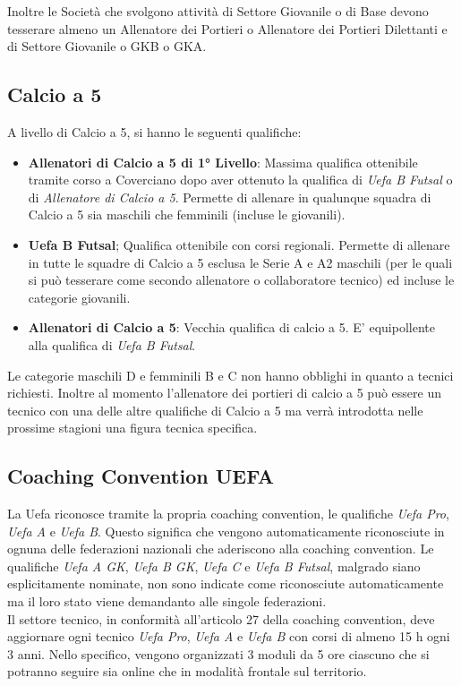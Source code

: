 \documentclass[../uefaC.tex]{subfiles}
\begin{document}
Inoltre le Società che svolgono attività di Settore Giovanile o di Base devono tesserare almeno un Allenatore dei Portieri o Allenatore dei Portieri Dilettanti e di Settore Giovanile o GKB o GKA.

\subsection{Calcio a 5}
A livello di Calcio a 5, si hanno le seguenti qualifiche:
\begin{itemize}
    \item\textbf{Allenatori di Calcio a 5 di 1° Livello}: Massima qualifica ottenibile tramite corso a Coverciano dopo aver ottenuto la qualifica di \emph{Uefa B Futsal} o di \emph{Allenatore di Calcio a 5}. Permette di allenare in qualunque squadra di Calcio a 5 sia maschili che femminili (incluse le giovanili).
    \item\textbf{Uefa B Futsal}; Qualifica ottenibile con corsi regionali. Permette di allenare in tutte le squadre di Calcio a 5 esclusa le Serie A e A2 maschili (per le quali si può tesserare come secondo allenatore o collaboratore tecnico) ed incluse le categorie giovanili.
    \item\textbf{Allenatori di Calcio a 5}: Vecchia qualifica di calcio a 5. E' equipollente alla qualifica di \emph{Uefa B Futsal}.
\end{itemize}

Le categorie maschili D e femminili B e C non hanno obblighi in quanto a tecnici richiesti. Inoltre al momento l'allenatore dei portieri di calcio a 5 può essere un tecnico con una delle altre qualifiche di Calcio a 5 ma verrà introdotta nelle prossime stagioni una figura tecnica specifica.

\subsection{Coaching Convention UEFA}
La Uefa riconosce tramite la propria coaching convention, le qualifiche \emph{Uefa Pro}, \emph{Uefa A} e \emph{Uefa B}. Questo significa che vengono automaticamente riconosciute in ognuna delle federazioni nazionali che aderiscono alla coaching convention. Le qualifiche \emph{Uefa A GK}, \emph{Uefa B GK}, \emph{Uefa C} e \emph{Uefa B Futsal}, malgrado siano esplicitamente nominate, non sono indicate come riconosciute automaticamente ma il loro stato viene demandanto alle singole federazioni. \hfill \\
Il settore tecnico, in conformità all'articolo 27 della coaching convention, deve aggiornare ogni tecnico \emph{Uefa Pro}, \emph{Uefa A} e \emph{Uefa B} con corsi di almeno 15 h ogni 3 anni. Nello specifico, vengono organizzati 3 moduli da 5 ore ciascuno che si potranno seguire sia online che in modalità frontale sul territorio.
\end{document}
